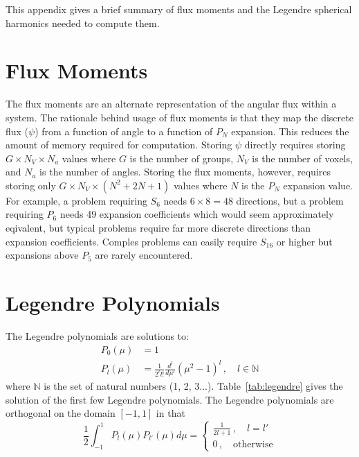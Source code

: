 
This appendix gives a brief summary of flux moments and the Legendre spherical harmonics needed to compute them.

\section{Flux Moments}\label{appdx:moments}

The flux moments are an alternate representation of the angular flux  within a system. The rationale behind usage of flux moments is that they map the discrete flux ($\psi$) from a function of angle to a function of $P_N$ expansion. This reduces the amount of memory required for computation. Storing $\psi$ directly requires storing $G \times N_V \times N_a$ values where $G$ is the number of groups, $N_V$ is the number of voxels, and $N_a$ is the number of angles. Storing the flux moments, however, requires storing only $G \times N_V \times (N^2 + 2N + 1)$ values where $N$ is the $P_N$ expansion value. For example, a problem requiring $S_6$ needs $6 \times 8 = 48$ directions, but a problem requiring $P_6$ needs 49 expansion coefficients which would seem approximately eqivalent, but typical problems require far more discrete directions than expansion coefficients. Comples problems can easily require $S_{16}$ or higher but expansions above $P_5$ are rarely encountered.

\section{Legendre Polynomials}\label{appdx:leg}

The Legendre polynomials are solutions to:
\begin{equation}
\begin{split}
P_0(\mu) &= 1 \\
P_l(\mu) &= \frac{1}{2^l l!} \frac{d^l}{d\mu^l}(\mu^2 - 1)^l \,, \quad l \in \mathbb{N}
\end{split}
\end{equation}
where $\mathbb{N}$ is the set of natural numbers (1, 2, 3...). Table~\ref{tab:legendre} gives the solution of the first few Legendre polynomials. The Legendre polynomials are orthogonal on the domain $[-1, 1]$ in that
\begin{equation}
\frac{1}{2} \int_{-1}^{1} P_l(\mu) P_{l'}(\mu) d\mu = 
\begin{cases}
\frac{1}{2l+1} \,, \quad l = l'\\
0 \,, \quad \text{otherwise}
\end{cases}
\end{equation}

